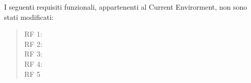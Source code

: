 		\begin{list}{-}{}
			\item{I seguenti requisiti funzionali, appartenenti al Current Envirorment, non sono stati modificati:}	
		\end{list}
		\begin{quote}	
			\begin{description}		
				\item[RF 1:]				
			
				\item[RF 2:]				
			
				\item[RF 3:]				
				\item[RF 4:]	
				\item[RF 5]	
				\begin{list}{}{}
				\end{list}
			\end{description}
		\end{quote}
	
